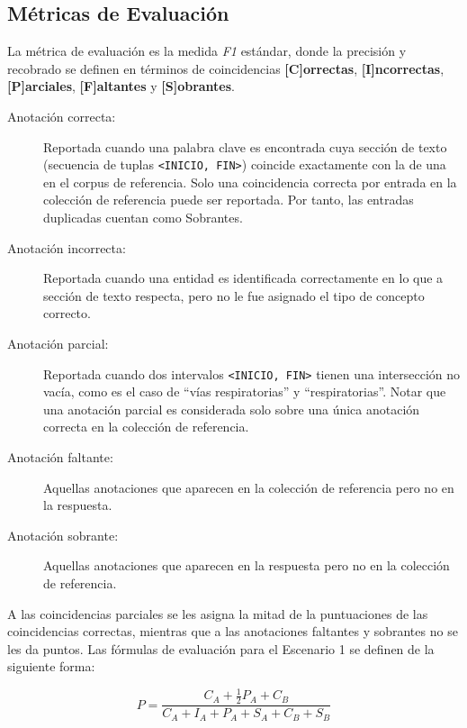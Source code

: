 \subsection{Métricas de Evaluación}

La métrica de evaluación es la medida \textit{F1} estándar, donde la precisión y recobrado se definen en términos de coincidencias \textbf{[C]orrectas}, \textbf{[I]ncorrectas},
\textbf{[P]arciales}, \textbf{[F]altantes} y \textbf{[S]obrantes}.


\begin{description}
	
	\item[Anotación correcta:] Reportada cuando una palabra clave es encontrada cuya sección de texto (secuencia de tuplas \texttt{<INICIO, FIN>}) coincide	exactamente con la de una en el corpus de referencia.
	Solo una coincidencia correcta por entrada en la colección de referencia puede ser reportada.
	Por tanto, las entradas duplicadas cuentan como Sobrantes.
	
	\item[Anotación incorrecta:] Reportada cuando una entidad es identificada correctamente en lo que a sección de texto respecta, pero no le fue asignado el tipo de concepto correcto.
	
	\item[Anotación parcial:] Reportada cuando dos intervalos \texttt{<INICIO, FIN>} tienen una intersección no vacía, como es el caso de “vías respiratorias”	y “respiratorias”.
	Notar que una anotación parcial es considerada solo sobre una única anotación correcta en la colección de referencia.
	
	\item[Anotación faltante:] Aquellas anotaciones que aparecen en la colección de	referencia pero no en la respuesta.
	
	\item[Anotación sobrante:] Aquellas anotaciones que aparecen en la respuesta pero no en la colección de referencia.
	
\end{description}

A las coincidencias parciales se les asigna la mitad de la
puntuaciones de las coincidencias correctas, mientras que a las anotaciones faltantes y sobrantes no se les da puntos.
Las fórmulas de evaluación para el Escenario 1 se definen de la siguiente forma:

\begin{equation*}
P = \frac{C_A + \frac{1}{2}P_A + C_B}{C_A + I_A + P_A + S_A + C_B + S_B}
\end{equation*}

